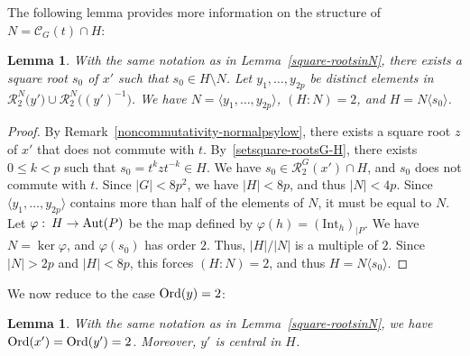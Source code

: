 \documentclass[12pt]{amsart}
\numberwithin{equation}{section}
\newcommand{\Ord}{{\rm Ord}}
\newcommand{\Aut}{{\rm Aut}}
\newtheorem{lem}[X]{Lemma}
\theoremstyle{definition}
\theoremstyle{remark}
\begin{document}
The following lemma provides more information on the structure of $N=\mathcal{C}_G(t)\cap H$:
\begin{lem}\label{StructureofH}
    With the same notation as in Lemma~\ref{square-rootsinN}, there exists a square root $s_0$ of $x'$ such that $s_0\in H\setminus N$. Let $y_1,\dots,y_{2p}$ be distinct elements in $\mathcal{R}_2^N\bigl( y'\bigr)\cup \mathcal{R}_2^N\bigl( (y')^{-1}\bigr)$. We have $N=\langle y_1,\dots,y_{2p}\rangle$, $(H:N)=2$, and $H=N\langle s_0\rangle$.
\end{lem}
\begin{proof}
    By Remark~\ref{noncommutativity-normalpsylow}, there exists a square root $z$ of $x'$ that does not commute with $t$. By~\eqref{setsquare-rootsG-H}, there exists $0\le k<p$ such that $s_0=t^k z t^{-k}\in H$. We have $s_0\in \mathcal{R}_2^G(x')\cap H$, and $s_0$ does not commute with $t$. Since $|G|<8p^2$, we have $|H|<8p$, and thus $|N|<4p$. Since $\langle y_1,\dots,y_{2p}\rangle$ contains more than half of the elements of $N$, it must be equal to $N$. Let $\varphi\, \colon\,  H\to \Aut(P)$ be the map defined by $\varphi(h)=(\mathrm{Int}_h)_{|P}$. We have $N=\ker \varphi$, and $\varphi(s_0)$ has order $2$. Thus, $|H|/|N|$ is a multiple of $2$. Since $|N|>2p$ and $|H|<8p$, this forces $(H:N)=2$, and thus $H=N\langle s_0\rangle$.
\end{proof}
We now reduce to the case $\Ord(y)=2$:
\begin{lem}\label{orderreduction}
     With the same notation as in Lemma~\ref{square-rootsinN}, we have $\Ord(x')=\Ord(y')=2$. Moreover, $y'$ is central in $H$.
\end{lem}
\end{document}
